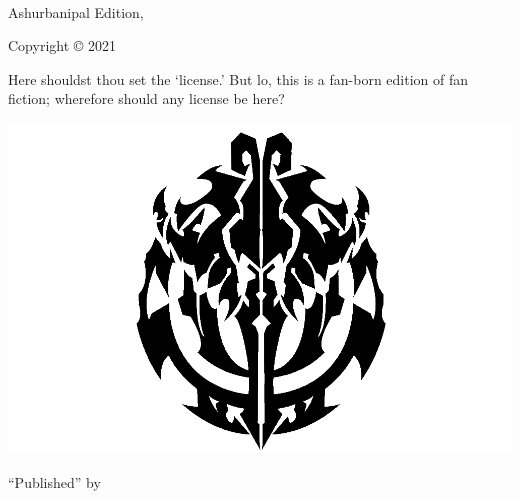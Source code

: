 {\small
\setlength{\parindent}{0em}\setlength{\parskip}{1em}
~
\vfill

Ashurbanipal Edition, \editionyear{}

Copyright \copyright{} 2021 \authorname

Here shouldst thou set the ‘license.’ But lo, this is a fan-born edition of fan fiction; wherefore should any license be here?

\ifx\isbn\undefined\else\if\relax\detokenize\expandafter{\isbn}\relax{}\fi\fi

\includegraphics[width=0.07\linewidth]{res/AOG.png}

``Published'' by \publisher{}
}